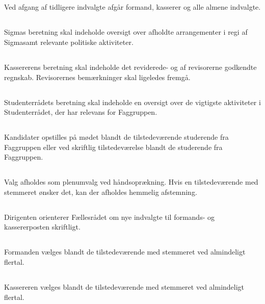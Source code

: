 \documentclass[danish,a4paper,twocolumn]{article}
\newcommand{\foreningen}{Sigma}
\begin{document}
\subsection{}Ved afgang af tidligere indvalgte afgår formand, kasserer og alle almene indvalgte.
\subsection{}\foreningen s beretning skal indeholde oversigt over afholdte arrangementer i regi af \foreningen samt relevante politiske aktiviteter.
\subsection{}Kassererens beretning skal indeholde det reviderede- og af revisorerne godkendte regnskab. Revisorernes bemærkninger skal ligeledes fremgå.
\subsection{}Studenterrådets beretning skal indeholde en oversigt over de vigtigste aktiviteter i Studenterrådet, der har relevans for Faggruppen.
\subsection{}Kandidater opstilles på mødet blandt de tilstedeværende studerende fra Faggruppen eller ved skriftlig tilstedeværelse blandt de studerende fra Faggruppen.
\subsection{}Valg afholdes som plenumvalg ved håndsoprækning. Hvis en tilstedeværende med stemmeret ønsker det, kan der afholdes hemmelig afstemning.
\subsection{}Dirigenten orienterer Fællesrådet om nye indvalgte til formands- og kassererposten skriftligt.
\subsection{}\label{stk:Formanden}Formanden vælges blandt de tilstedeværende med stemmeret ved almindeligt flertal. 
\subsection{}Kassereren vælges blandt de tilstedeværende med stemmeret ved almindeligt flertal.
\end{document}
